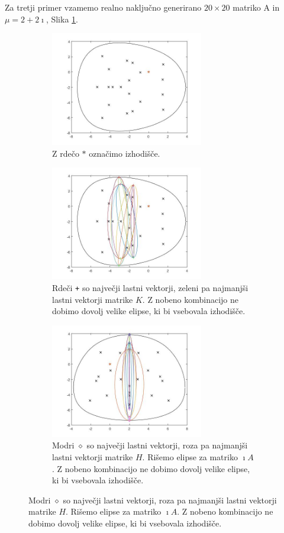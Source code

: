 \documentclass[12pt,a4paper]{amsart}
\theoremstyle{definition}
\theoremstyle{plain}
\begin{document}
Za tretji primer vzamemo realno naključno generirano $20\times 20$ matriko A in $\mu = 2 + 2\imath$, Slika \ref{fig:p51}.
\begin{figure}[H]
\begin{subfigure}[t]{0.45\textwidth}
\includegraphics[width=0.9\linewidth,height=5cm]{RC3.jpg}
\caption{Z rdečo $\ast$ označimo izhodišče.}
\label{fig:p51}
\end{subfigure}%
\hfill
\begin{subfigure}[t]{0.45\textwidth}
\includegraphics[width=0.9\linewidth,height=5cm]{RC3e1.jpg}
\caption{Rdeči \verb~+~ so največji lastni vektorji, zeleni pa najmanjši lastni vektorji matrike $K$\footnotemark[\value{footnote}]. Z nobeno kombinacijo ne dobimo dovolj velike elipse, ki bi vsebovala izhodišče.}
\label{fig:p52}
\end{subfigure}
\begin{subfigure}[t]{0.45\textwidth}
\includegraphics[width=0.9\linewidth,height=5cm]{RC3e2.jpg}
\caption{Modri $\diamond$ so največji lastni vektorji, roza pa najmanjši lastni vektorji matrike $H$\footnotemark[\value{footnote}]. Rišemo elipse za matriko $\imath A$. Z nobeno kombinacijo ne dobimo dovolj velike elipse, ki bi vsebovala izhodišče.}

\end{subfigure}
\end{figure}
\end{document}
